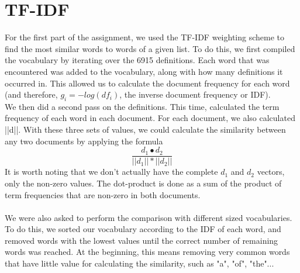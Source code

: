 \documentclass[10pt, a4paper, oneside]{article} %
\begin{document}
\section{TF-IDF}
For the first part of the assignment, we used the TF-IDF weighting scheme to find the most similar words to words of a given list. To do this, we first compiled the vocabulary by iterating over the 6915 definitions. Each word that was encountered was added to the vocabulary, along with how many definitions it occurred in. This allowed us to calculate the document frequency for each word (and therefore, $g_i = -log(df_i)$, the inverse document frequency or IDF).\\ 
We then did a second pass on the definitions. This time, calculated the term frequency of each word in each document. For each document, we also calculated ||d||. With these three sets of values, we could calculate the similarity between any two documents by applying the formula 
$$ \frac{d_1 \bullet d_2}{||d_1|| * ||d_2||}$$
It is worth noting that we don't actually have the complete $d_1$ and $d_2$ vectors, only the non-zero values. The dot-product is done as a sum of the product of term frequencies that are non-zero in both documents. \\ \\

We were also asked to perform the comparison with different sized vocabularies. To do this, we sorted our vocabulary according to the IDF of each word, and removed words with the lowest values until the correct number of remaining words was reached. At the beginning, this means removing very common words that have little value for calculating the similarity, such as "a", "of", "the"... \\ \\
\end{document}
